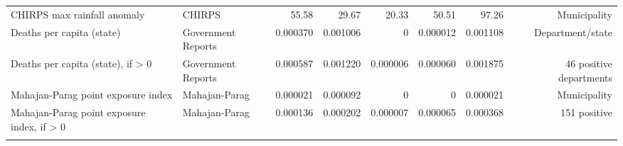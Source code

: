 \begin{tabular}{llrrrrrr}
CHIRPS max rainfall anomaly & CHIRPS & 55.58 & 29.67 & 20.33 & 50.51 & 97.26 & Municipality \\
Deaths per capita (state) & Government Reports & 0.000370 & 0.001006 & 0 & 0.000012 & 0.001108 & Department/state \\
Deaths per capita (state), if > 0 & Government Reports & 0.000587 & 0.001220 & 0.000006 & 0.000060 & 0.001875 & 46 positive departments \\
Mahajan-Parag point exposure index & Mahajan-Parag & 0.000021 & 0.000092 & 0 & 0 & 0.000021 & Municipality \\
Mahajan-Parag point exposure index, if > 0 & Mahajan-Parag & 0.000136 & 0.000202 & 0.000007 & 0.000065 & 0.000368 & 151 positive \\
\addlinespace[0.35em]
\bottomrule
\end{tabular}
